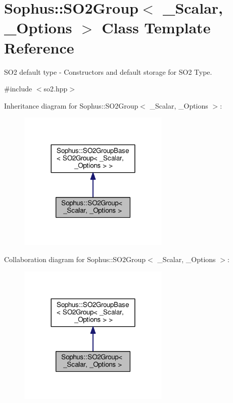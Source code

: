 \hypertarget{class_sophus_1_1_s_o2_group}{}\section{Sophus\+:\+:S\+O2\+Group$<$ \+\_\+\+Scalar, \+\_\+\+Options $>$ Class Template Reference}
\label{class_sophus_1_1_s_o2_group}


S\+O2 default type -\/ Constructors and default storage for S\+O2 Type.  




{\ttfamily \#include $<$so2.\+hpp$>$}



Inheritance diagram for Sophus\+:\+:S\+O2\+Group$<$ \+\_\+\+Scalar, \+\_\+\+Options $>$\+:
\nopagebreak
\begin{figure}[H]
\begin{center}
\leavevmode
\includegraphics[width=204pt]{class_sophus_1_1_s_o2_group__inherit__graph}
\end{center}
\end{figure}


Collaboration diagram for Sophus\+:\+:S\+O2\+Group$<$ \+\_\+\+Scalar, \+\_\+\+Options $>$\+:
\nopagebreak
\begin{figure}[H]
\begin{center}
\leavevmode
\includegraphics[width=204pt]{class_sophus_1_1_s_o2_group__coll__graph}
\end{center}
\end{figure}
